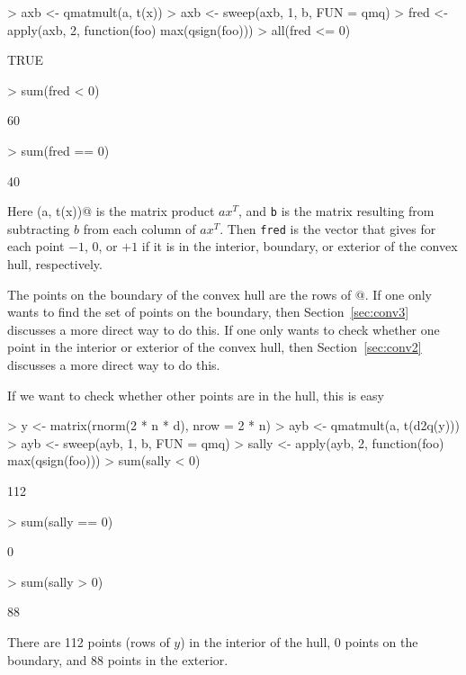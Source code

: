 \documentclass{article}
\begin{document}
\begin{Schunk}
\begin{Sinput}
> axb <- qmatmult(a, t(x))
> axb <- sweep(axb, 1, b, FUN = qmq)
> fred <- apply(axb, 2, function(foo) max(qsign(foo)))
> all(fred <= 0)
\end{Sinput}
\begin{Soutput}
[1] TRUE
\end{Soutput}
\begin{Sinput}
> sum(fred < 0)
\end{Sinput}
\begin{Soutput}
[1] 60
\end{Soutput}
\begin{Sinput}
> sum(fred == 0)
\end{Sinput}
\begin{Soutput}
[1] 40
\end{Soutput}
\end{Schunk}
Here \verb@qmatmult(a, t(x))@ is the matrix product $a x^T$, and \texttt{b}
is the matrix resulting from subtracting $b$ from each column of $a x^T$.
Then \texttt{fred} is the vector that gives for each point $-1$, $0$, or $+1$
if it is in the interior, boundary, or exterior of the convex hull,
respectively.

The points on the boundary of the convex hull are the rows
of \verb@x[fred == 0, ]@.
If one only wants to find the set of points on the boundary,
then Section~\ref{sec:conv3} discusses a more direct way to do this.
If one only wants to check whether one point in the interior or exterior
of the convex hull,
then Section~\ref{sec:conv2} discusses a more direct way to do this.

If we want to check whether other points are in the hull, this is easy
\begin{Schunk}
\begin{Sinput}
> y <- matrix(rnorm(2 * n * d), nrow = 2 * n)
> ayb <- qmatmult(a, t(d2q(y)))
> ayb <- sweep(ayb, 1, b, FUN = qmq)
> sally <- apply(ayb, 2, function(foo) max(qsign(foo)))
> sum(sally < 0)
\end{Sinput}
\begin{Soutput}
[1] 112
\end{Soutput}
\begin{Sinput}
> sum(sally == 0)
\end{Sinput}
\begin{Soutput}
[1] 0
\end{Soutput}
\begin{Sinput}
> sum(sally > 0)
\end{Sinput}
\begin{Soutput}
[1] 88
\end{Soutput}
\end{Schunk}
There are 112 points (rows of $y$) in the interior of the
hull, 0 points on the boundary,
and 88 points in the exterior.
\end{document}
